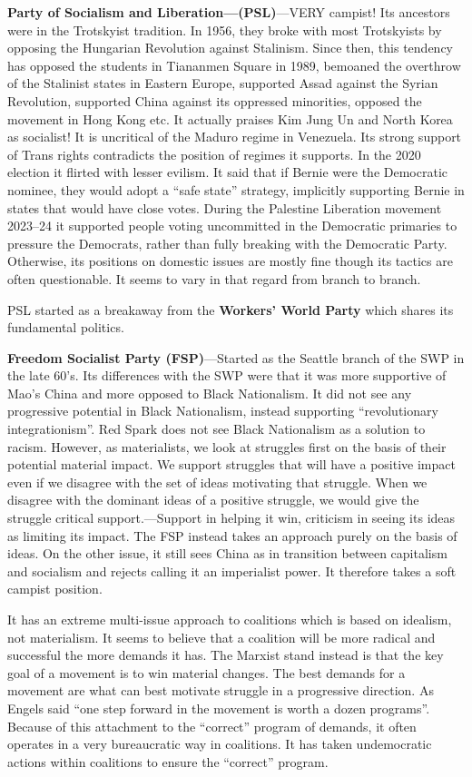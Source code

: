 \textbf{Party of Socialism and Liberation---(PSL)}---VERY campist! Its ancestors were in the Trotskyist tradition. In 1956, they broke with most Trotskyists by opposing the Hungarian Revolution against Stalinism. Since then, this tendency has opposed the students in Tiananmen Square in 1989, bemoaned the overthrow of the Stalinist states in Eastern Europe, supported Assad against the Syrian Revolution, supported China against its oppressed minorities, opposed the movement in Hong Kong etc. It actually praises Kim Jung Un and North Korea as socialist! It is uncritical of the Maduro regime in Venezuela. Its strong support of Trans rights contradicts the position of regimes it supports. In the 2020 election it flirted with lesser evilism. It said that if Bernie were the Democratic nominee, they would adopt a ``safe state'' strategy, implicitly supporting Bernie in states that would have close votes. During the Palestine Liberation movement 2023--24 it supported people voting uncommitted in the Democratic primaries to pressure the Democrats, rather than fully breaking with the Democratic Party. Otherwise, its positions on domestic issues are mostly fine though its tactics are often questionable. It seems to vary in that regard from branch to branch.

PSL started as a breakaway from the \textbf{Workers' World Party} which shares its fundamental politics.

\textbf{Freedom Socialist Party (FSP)}---Started as the Seattle branch of the SWP in the late 60's. Its differences with the SWP were that it was more supportive of Mao's China and more opposed to Black Nationalism. It did not see any progressive potential in Black Nationalism, instead supporting ``revolutionary integrationism''. Red Spark does not see Black Nationalism as a solution to racism. However, as materialists, we look at struggles first on the basis of their potential material impact. We support struggles that will have a positive impact even if we disagree with the set of ideas motivating that struggle. When we disagree with the dominant ideas of a positive struggle, we would give the struggle critical support.---Support in helping it win, criticism in seeing its ideas as limiting its impact. The FSP instead takes an approach purely on the basis of ideas. On the other issue, it still sees China as in transition between capitalism and socialism and rejects calling it an imperialist power. It therefore takes a soft campist position.

It has an extreme multi-issue approach to coalitions which is based on idealism, not materialism. It seems to believe that a coalition will be more radical and successful the more demands it has. The Marxist stand instead is that the key goal of a movement is to win material changes. The best demands for a movement are what can best motivate struggle in a progressive direction. As Engels said ``one step forward in the movement is worth a dozen programs''. Because of this attachment to the ``correct'' program of demands, it often operates in a very bureaucratic way in coalitions. It has taken undemocratic actions within coalitions to ensure the ``correct'' program.

